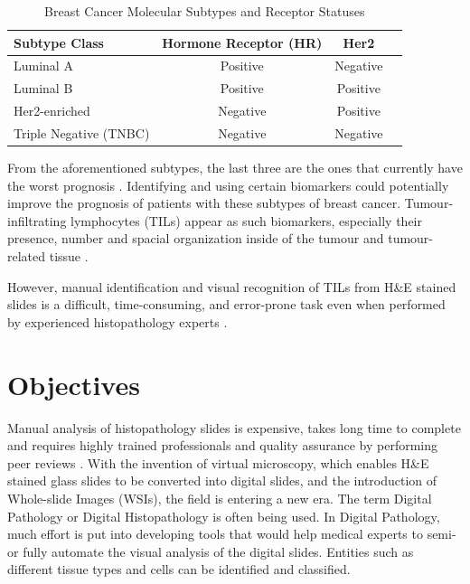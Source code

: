 \begin{table}[H]
    \centering
    \caption{Breast Cancer Molecular Subtypes and Receptor Statuses}
    \label{tab:breast_cancer_subtypes}
    \begin{tabular}{|l|c|c|c|}
        \hline
        \textbf{Subtype Class} & \textbf{Hormone Receptor (HR)} & \textbf{Her2} \\
        \hline
        Luminal A & Positive & Negative \\
        \hline
        Luminal B & Positive & Positive \\
        \hline
        Her2-enriched & Negative & Positive \\
        \hline
        Triple Negative (TNBC) & Negative & Negative \\
        \hline
    \end{tabular}
\end{table}

From the aforementioned subtypes, the last three are the ones that currently have the worst prognosis \cite{Schalper2022, Zhang2024}. Identifying and using certain biomarkers could potentially improve the prognosis of patients with these subtypes of breast cancer. Tumour-infiltrating lymphocytes (TILs) appear as such biomarkers, especially their presence, number and spacial organization inside of the tumour and tumour-related tissue \cite{Salgado2015, Denkert2018, Amgad2019}.

However, manual identification and visual recognition of TILs from H\&E stained slides is a difficult, time-consuming, and error-prone task even when performed by experienced histopathology experts \cite{Salgado2015, Amgad2019}.

\section{Objectives}
Manual analysis of histopathology slides is expensive, takes long time to complete and requires highly trained professionals and quality assurance by performing peer reviews \cite{Wemmert2021}. With the invention of virtual microscopy, which enables H\&E stained glass slides to be converted into digital slides, and the introduction of Whole-slide Images (WSIs), the field is entering a new era. The term Digital Pathology or Digital Histopathology is often being used. In Digital Pathology, much effort is put into developing tools that would help medical experts to semi- or fully automate the visual analysis of the digital slides. Entities such as different tissue types and cells can be identified and classified.

